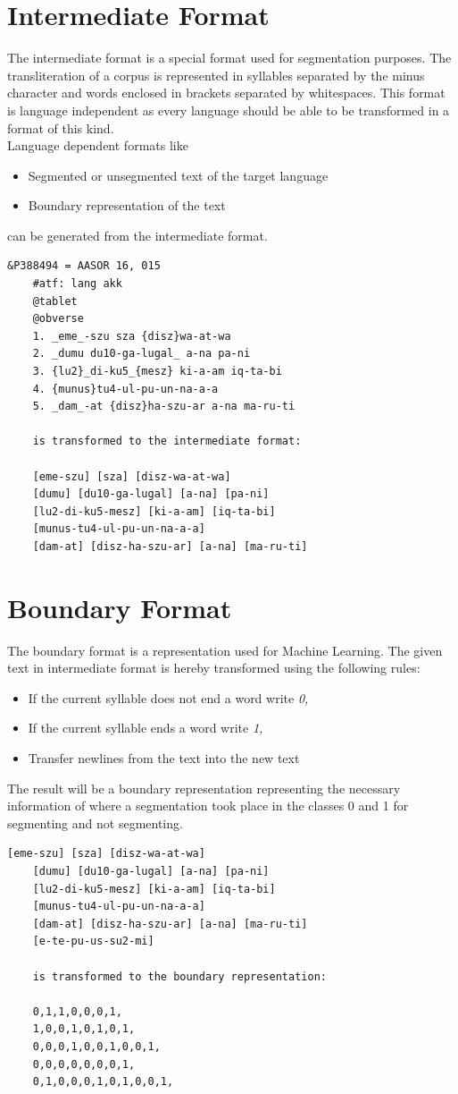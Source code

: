 \documentclass[10pt,a4paper,titlepage]{report}
\begin{document}
	\section{Intermediate Format}
	The intermediate format is a special format used for segmentation purposes. The transliteration of a corpus is represented in syllables separated by the minus character and words enclosed in brackets separated by whitespaces. This format is language independent as every language should be able to be transformed in a format of this kind.\\
	Language dependent formats like 
	\begin{itemize}
		\item Segmented or unsegmented text of the target language
		\item Boundary representation of the text
	\end{itemize}
	can be generated from the intermediate format.
	\begin{lstlisting}[caption=Intermediate Format]
	&P388494 = AASOR 16, 015
	#atf: lang akk
	@tablet
	@obverse
	1. _eme_-szu sza {disz}wa-at-wa
	2. _dumu du10-ga-lugal_ a-na pa-ni
	3. {lu2}_di-ku5_{mesz} ki-a-am iq-ta-bi
	4. {munus}tu4-ul-pu-un-na-a-a
	5. _dam_-at {disz}ha-szu-ar a-na ma-ru-ti
	
	is transformed to the intermediate format:
	
	[eme-szu] [sza] [disz-wa-at-wa] 
	[dumu] [du10-ga-lugal] [a-na] [pa-ni] 
	[lu2-di-ku5-mesz] [ki-a-am] [iq-ta-bi] 
	[munus-tu4-ul-pu-un-na-a-a] 
	[dam-at] [disz-ha-szu-ar] [a-na] [ma-ru-ti] 
	\end{lstlisting}
	\section{Boundary Format}
	The boundary format is a representation used for Machine Learning. The given text in intermediate format is hereby transformed using the following rules:
	\begin{itemize}
		\item If the current syllable does not end a word write \textit{0,}
		\item If the current syllable ends a word write \textit{1,}
		\item Transfer newlines from the text into the new text
	\end{itemize}
	The result will be a boundary representation representing the necessary information of where a segmentation took place in the classes 0 and 1 for segmenting and not segmenting.
	\begin{lstlisting}[caption=Boundary Representation]
	[eme-szu] [sza] [disz-wa-at-wa] 
	[dumu] [du10-ga-lugal] [a-na] [pa-ni] 
	[lu2-di-ku5-mesz] [ki-a-am] [iq-ta-bi] 
	[munus-tu4-ul-pu-un-na-a-a] 
	[dam-at] [disz-ha-szu-ar] [a-na] [ma-ru-ti] 
	[e-te-pu-us-su2-mi]
	
	is transformed to the boundary representation:
	
	0,1,1,0,0,0,1,
	1,0,0,1,0,1,0,1,
	0,0,0,1,0,0,1,0,0,1,
	0,0,0,0,0,0,0,1,
	0,1,0,0,0,1,0,1,0,0,1,
	\end{lstlisting}
\end{document}
